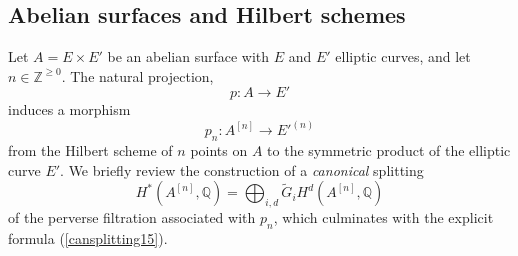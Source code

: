 \documentclass[11pt]{amsart}
\theoremstyle{plain}
\theoremstyle{definition}
\theoremstyle{remark}
\newcommand{\BQ}{{\mathbb{Q}}}
\newcommand{\BZ}{{\mathbb{Z}}}
\begin{document}
\subsection{Abelian surfaces and Hilbert schemes}\label{Section1.5}
Let $A = E \times E'$ be an abelian surface with $E$ and $E'$ elliptic curves, and let $n \in \BZ^{\geq 0}$.
The natural projection, 
\[
p: A \to E'
\]
induces a morphism
\[
p_n: A^{[n]} \to {E'}^{(n)}
\]
from the Hilbert scheme of $n$ points on $A$ to the symmetric product of the elliptic curve $E'$. 
We briefly review the construction \cite{SZ} of a  \emph{canonical} splitting 
\begin{equation}\label{canonical_split}
H^\ast(A^{[n]}, \BQ) = \bigoplus_{i,d}\widetilde{G}_iH^d(A^{[n]},\BQ)
\end{equation}
of the perverse filtration associated with $p_n$, which culminates with  the explicit formula (\ref{cansplitting15}).
\end{document}
